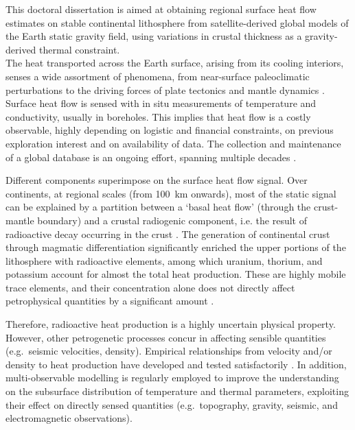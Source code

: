 This doctoral dissertation is aimed at obtaining regional surface heat flow estimates on stable continental lithosphere from satellite-derived global models of the Earth static gravity field, using variations in crustal thickness as a gravity-derived thermal constraint.
\\

The heat transported across the Earth surface, arising from its cooling interiors, senses a wide assortment of phenomena, from near-surface paleoclimatic perturbations \parencite{Majorowicz2011} to the driving forces of plate tectonics and mantle dynamics \parencite{Cooper2017}.
Surface heat flow is sensed with in situ measurements of temperature and conductivity, usually in boreholes.
This implies that heat flow is a costly observable, highly depending on logistic and financial constraints, on previous exploration interest and on availability of data.
The collection and maintenance of a global database is an ongoing effort, spanning multiple decades \parencites{Lee1965}{Hasterok2008}.

Different components superimpose on the surface heat flow signal.
Over continents, at regional scales (from \SI{100}{\kilo \metre} onwards), most of the static signal can be explained by a partition between a `basal heat flow' (through the crust-mantle boundary) and a crustal radiogenic component, i.e. the result of radioactive decay occurring in the crust \parencite{Jaupart2016}.
The generation of continental crust through magmatic differentiation significantly enriched the upper portions of the lithosphere with radioactive elements, among which uranium, thorium, and potassium account for almost the total heat production.
These are highly mobile trace elements, and their concentration alone does not directly affect petrophysical quantities by a significant amount \parencite{Hasterok2017_mis}.

Therefore, radioactive heat production is a highly uncertain physical property.
However, other petrogenetic processes concur in affecting sensible quantities (e.g.~seismic velocities, density).
Empirical relationships from velocity and/or density to heat production have developed and tested satisfactorily \parencites{Rudnick2003}{Vila2010}{Hasterok2017_ign}.
In addition, multi-observable modelling \parencites[e.g.][]{Mather2018}{Afonso2019} is regularly employed to improve the understanding on the subsurface distribution of temperature and thermal parameters, exploiting their effect on directly sensed quantities (e.g.~topography, gravity, seismic, and electromagnetic observations).
\\

